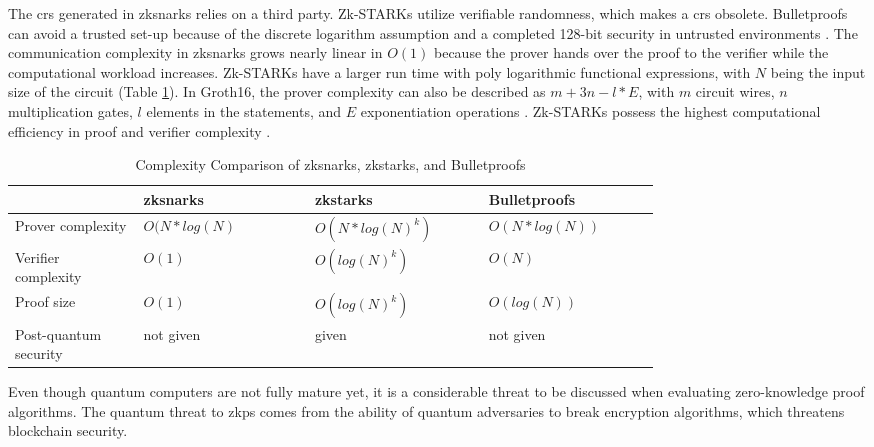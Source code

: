 The \acrshort{crs} generated in \acrshort{zksnark}s relies on a third party. Zk-STARKs utilize verifiable randomness, which makes a \acrshort{crs} obsolete. Bulletproofs can avoid a trusted set-up because of the discrete logarithm assumption and a completed 128-bit security in untrusted environments \citep{Huangetal}. The communication complexity in \acrshort{zksnark}s grows nearly linear in \(O(1)\) because the prover hands over the proof to the verifier while the computational workload increases. Zk-STARKs have a larger run time with poly logarithmic functional expressions, with \(N\) being the input size of the circuit (Table \ref{tab:complexity}). In Groth16, the prover complexity can also be described as \(m + 3n - l*E\), with \(m\) circuit wires, \(n\) multiplication gates, \(l\) elements in the statements, and \(E\) exponentiation operations \citep{Groth2016OnTS}. Zk-STARKs possess the highest computational efficiency in proof and verifier complexity \citep{gongetal}.
\setlength{\tabcolsep}{2ex}
\renewcommand{\arraystretch}{1.5}%
\begin{table}[ht]
	\centering
	    \caption{Complexity Comparison of \acrshort{zksnark}s, \acrshort{zkstark}s, and Bulletproofs}
		\begin{tabular}{| m{0.15\linewidth} | m{0.2\linewidth} |              m{0.2\linewidth}      | m{0.2\linewidth}|} \hline
		\textbf{} & \textbf{\acrshort{zksnark}s} & \textbf{\acrshort{zkstark}s} &\textbf{Bulletproofs}       \\ \hline
            Prover \newline complexity & \(O(N*log(N)\) & \(O(N*log(N)^k)\) & \(O(N*log(N))\) \\  \hline
            Verifier \newline complexity & \(O(1)\) & \(O(log(N)^k)\) & \(O(N)\) \\ \hline 
            Proof size & \(O(1)\) & \(O(log(N)^k)\) &  \(O(log(N))\)\\  \hline
            Post-quantum security &  not given & given & not given\\  \hline 
	\end{tabular}
\label{tab:complexity}
\end{table}

Even though quantum computers are not fully mature yet, it is a considerable threat to be discussed when evaluating zero-knowledge proof algorithms. The quantum threat to \acrshort{zkp}s comes from the ability of quantum adversaries to break encryption algorithms, which threatens blockchain security.


